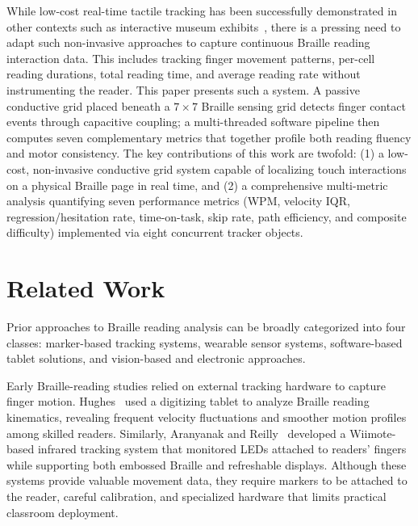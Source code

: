 \documentclass[conference]{IEEEtran}
\begin{document}
    While low-cost real-time tactile tracking has been successfully demonstrated in other contexts such as interactive museum exhibits~\cite{ajay-tactile1, ajay-tactile2}, there is a pressing need to adapt such non-invasive approaches to capture continuous Braille reading interaction data. This includes tracking finger movement patterns, per-cell reading durations, total reading time, and average reading rate without instrumenting the reader.
    This paper presents such a system. A passive conductive grid placed
    beneath a $7\times7$ Braille sensing grid detects finger contact
    events through capacitive coupling; a multi-threaded software pipeline
    then computes seven complementary metrics that together profile both
    reading fluency and motor consistency. The key contributions of this
    work are twofold: (1) a low-cost, non-invasive conductive grid system capable of localizing touch interactions on a physical Braille page in real time, and (2) a comprehensive multi-metric analysis quantifying seven performance metrics (WPM, velocity IQR, regression/hesitation rate, time-on-task, skip rate, path efficiency, and composite difficulty) implemented via eight concurrent tracker objects.

    \section{Related Work}
    \label{sec:related}

    Prior approaches to Braille reading analysis can be broadly
    categorized into four classes: marker-based tracking systems,
    wearable sensor systems, software-based tablet solutions, and
    vision-based and electronic approaches. 


    Early Braille-reading studies relied on external tracking hardware to
    capture finger motion. Hughes~\cite{b5} used a digitizing tablet to analyze Braille
    reading kinematics, revealing frequent velocity fluctuations and
    smoother motion profiles among skilled readers. Similarly, Aranyanak and
    Reilly~\cite{b6} developed a Wiimote-based infrared tracking system
    that monitored LEDs attached to readers' fingers while supporting both
    embossed Braille and refreshable displays. Although these systems
    provide valuable movement data, they require markers to be attached to
    the reader, careful calibration, and specialized hardware that limits
    practical classroom deployment.
\end{document}
